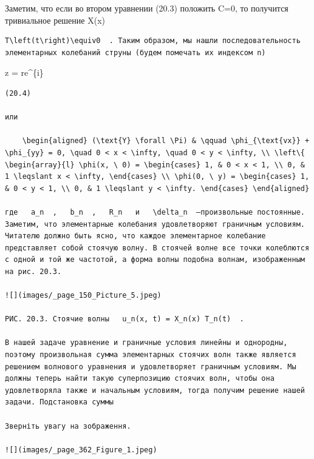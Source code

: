 \documentclass[
  ukrainian,
]{article}
\begin{document}
Заметим, что если во втором уравнении (20.3) положить C=0, то получится
тривиальное решение X\left(x\right)

\begin{verbatim}
T\left(t\right)\equiv0  . Таким образом, мы нашли последовательность элементарных колебаний струны (будем помечать их индексом n)
\end{verbatim}

z = re\^{}\{i\theta\}

\begin{verbatim}
(20.4)

или

    \begin{aligned} (\text{Y} \forall \Pi) & \qquad \phi_{\text{vx}} + \phi_{yy} = 0, \quad 0 < x < \infty, \quad 0 < y < \infty, \\ \left\{ \begin{array}{l} \phi(x, \ 0) = \begin{cases} 1, & 0 < x < 1, \\ 0, & 1 \leqslant x < \infty, \end{cases} \\ \phi(0, \ y) = \begin{cases} 1, & 0 < y < 1, \\ 0, & 1 \leqslant y < \infty. \end{cases} \end{aligned}

где   a_n  ,   b_n  ,   R_n   и   \delta_n  —произвольные постоянные. Заметим, что элементарные колебания удовлетворяют граничным условиям. Читателю должно быть ясно, что каждое элементарное колебание представляет собой стоячую волну. В стоячей волне все точки колеблются с одной и той же частотой, а форма волны подобна волнам, изображенным на рис. 20.3.

![](images/_page_150_Picture_5.jpeg)

РИС. 20.3. Стоячие волны   u_n(x, t) = X_n(x) T_n(t)  .

В нашей задаче уравнение и граничные условия линейны и однородны, поэтому произвольная сумма элементарных стоячих волн также является решением волнового уравнения и удовлетворяет граничным условиям. Мы должны теперь найти такую суперпозицию стоячих волн, чтобы она удовлетворяла также и начальным условиям, тогда получим решение нашей задачи. Подстановка суммы

Зверніть увагу на зображення.

![](images/_page_362_Figure_1.jpeg)


\end{verbatim}
\end{document}
